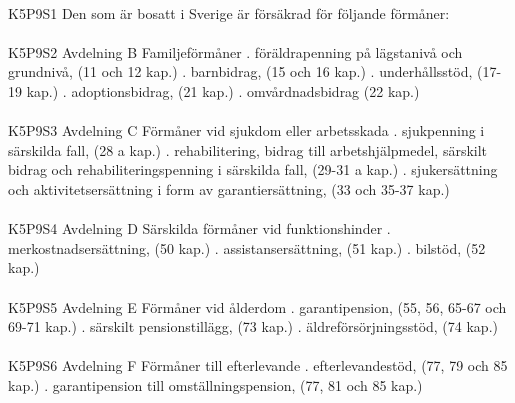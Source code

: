 \documentclass[a4paper,notitlepage,openany,10pt]{book}
\begin{document}
\paragraph*{}
{\tiny K5P9S1}
Den som är bosatt i Sverige är försäkrad för följande förmåner:
\paragraph*{}
{\tiny K5P9S2}
Avdelning B Familjeförmåner
. föräldrapenning på lägstanivå
och grundnivå, (11 och 12 kap.)
. barnbidrag, (15 och 16 kap.)
. underhållsstöd, (17-19 kap.)
. adoptionsbidrag, (21 kap.)
. omvårdnadsbidrag (22 kap.)
\paragraph*{}
{\tiny K5P9S3}
Avdelning C Förmåner vid sjukdom eller arbetsskada
. sjukpenning i särskilda fall, (28 a kap.)
. rehabilitering, bidrag till arbetshjälpmedel, särskilt bidrag och rehabiliteringspenning i
särskilda fall, (29-31 a kap.)
. sjukersättning och aktivitetsersättning i form av
garantiersättning, (33 och 35-37 kap.)
\paragraph*{}
{\tiny K5P9S4}
Avdelning D Särskilda förmåner vid funktionshinder
. merkostnadsersättning, (50 kap.)
. assistansersättning, (51 kap.)
. bilstöd, (52 kap.)
\paragraph*{}
{\tiny K5P9S5}
Avdelning E Förmåner vid ålderdom
. garantipension, (55, 56, 65-67 och
69-71 kap.)
. särskilt pensionstillägg, (73 kap.)
. äldreförsörjningsstöd, (74 kap.)
\paragraph*{}
{\tiny K5P9S6}
Avdelning F Förmåner till efterlevande
. efterlevandestöd, (77, 79 och 85 kap.)
. garantipension till
omställningspension, (77, 81 och 85 kap.)
\end{document}
